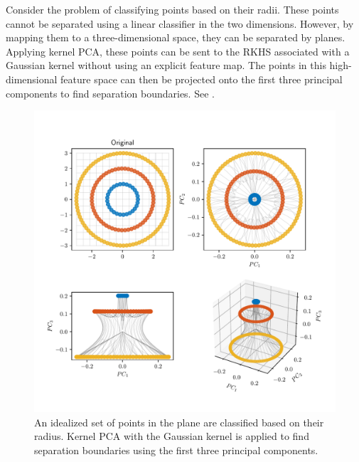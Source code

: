 \begin{example}
    \label{eg:gaussian-kpca}
    Consider the problem of classifying points based on their radii.
    These points cannot be separated using a linear classifier in the two dimensions.
    However, by mapping them to a three-dimensional space, they can be separated by planes.
    Applying kernel PCA, these points can be sent to the RKHS associated with a Gaussian kernel without using an explicit feature map.
    The points in this high-dimensional feature space can then be projected onto the first three principal components to find separation boundaries.
    See .
    \begin{figure}
        \includegraphics[width=\textwidth]{figs/fig_kpca_example.pdf}
        \caption{An idealized set of points in the plane are classified based on their radius. Kernel PCA with the Gaussian kernel is applied to find separation boundaries using the first three principal components.}
        \label{fig:gaussian-kpca-example}
    \end{figure}
\end{example}